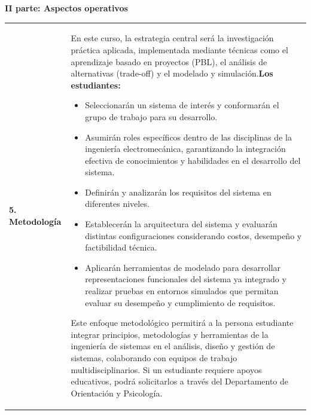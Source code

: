 \documentclass[letterpaper]{article}%
\begin{document}
\newpage%
\par\fontsize{14}{0}\selectfont \textbf{\textcolor{parte}{II parte: Aspectos operativos}}%
\vspace*{4mm}%
\newline%
\fontsize{10}{12}\selectfont %
\begin{tabularx}{\textwidth}{p{3cm}p{13cm}}%
\par\fontsize{12}{14}\selectfont \textbf{\textcolor{parte}{5. Metodología}}&En este curso, la estrategia central será la investigación práctica aplicada, implementada mediante técnicas como el aprendizaje basado en proyectos (PBL), el análisis de alternativas (trade-off) y el modelado y simulación.\newline\newline \textbf{Los estudiantes:}\begin{itemize}\item Seleccionarán un sistema de interés y conformarán el grupo de trabajo para su desarrollo.\item Asumirán roles específicos dentro de las disciplinas de la ingeniería electromecánica, garantizando la integración efectiva de conocimientos y habilidades en el desarrollo del sistema.\item Definirán y analizarán los requisitos del sistema en diferentes niveles.\item Establecerán la arquitectura del sistema y evaluarán distintas configuraciones considerando costos, desempeño y factibilidad técnica.\item Aplicarán herramientas de modelado para desarrollar representaciones funcionales del sistema ya integrado y realizar pruebas en entornos simulados que permitan evaluar su desempeño y cumplimiento de requisitos.\end{itemize}\vspace*{2mm}Este enfoque metodológico permitirá a la persona estudiante integrar principios, metodologías y herramientas de la ingeniería de sistemas en el análisis, diseño y gestión de sistemas, colaborando con equipos de trabajo multidisciplinarios.\vspace*{2mm} \newline  Si un estudiante requiere apoyos educativos, podrá solicitarlos a través del Departamento de Orientación y Psicología.\\%
\end{tabularx}%
\vspace*{2mm}%
\newline%
\end{document}
